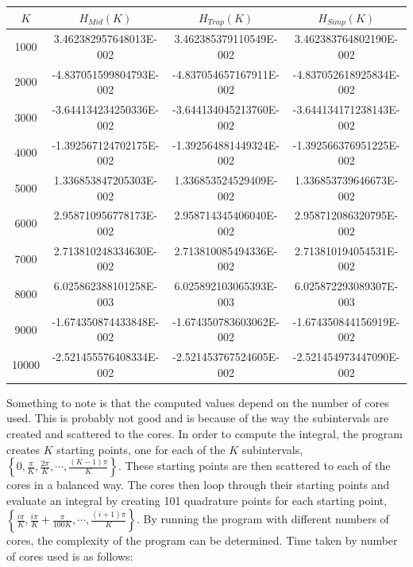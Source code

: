 \documentclass{article}
\theoremstyle{remark}
\theoremstyle{remark}
\newcommand{\p}{\phantom{-}}
\begin{document}
	\begin{table}[H]
		\begin{tabular}{cccc}
			\toprule[0.5mm]
			 $K$  &        $H_{Mid}(K)$       &       $H_{Trap}(K)$       &       $H_{Simp}(K)$       \\ 
			\midrule
		 	 1000 & \p 3.462382957648013E-002 & \p 3.462385379110549E-002 & \p 3.462383764802190E-002 \\
			 2000 &   -4.837051599804793E-002 &   -4.837054657167911E-002 &   -4.837052618925834E-002 \\
			 3000 &   -3.644134234250336E-002 &   -3.644134045213760E-002 &   -3.644134171238143E-002 \\
			 4000 &   -1.392567124702175E-002 &   -1.392564881449324E-002 &   -1.392566376951225E-002 \\
			 5000 & \p 1.336853847205303E-002 & \p 1.336853524529409E-002 & \p 1.336853739646673E-002 \\
			 6000 & \p 2.958710956778173E-002 & \p 2.958714345406040E-002 & \p 2.958712086320795E-002 \\
			 7000 & \p 2.713810248334630E-002 & \p 2.713810085494336E-002 & \p 2.713810194054531E-002 \\
			 8000 & \p 6.025862388101258E-003 & \p 6.025892103065393E-003 & \p 6.025872293089307E-003 \\
			 9000 &   -1.674350874433848E-002 &   -1.674350783603062E-002 &   -1.674350844156919E-002 \\
			10000 &   -2.521455576408334E-002 &   -2.521453767524605E-002 &   -2.521454973447090E-002 \\
			\bottomrule[0.5mm]
		\end{tabular}
	\end{table}
	Something to note is that the computed values depend on the number of cores used. This is probably not good and is because of the way the subintervals are created and scattered to the cores. In order to compute the integral, the program creates $K$ starting points, one for each of the $K$ subintervals, $\left\{0,\frac{\pi}{K},\frac{2\pi}{K},\cdots,\frac{(K-1)\pi}{K}\right\}$. These starting points are then scattered to each of the cores in a balanced way. The cores then loop through their starting points and evaluate an integral by creating 101 quadrature points for each starting point, $\left\{\frac{i\pi}{K},\frac{i\pi}{K}+\frac{\pi}{100K},\cdots,\frac{(i+1)\pi}{K}\right\}$. By running the program with different numbers of cores, the complexity of the program can be determined. Time taken by number of cores used is as follows: \par
\end{document}
